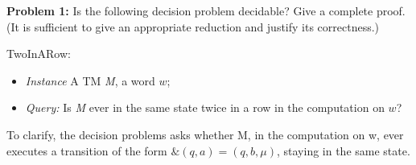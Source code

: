 
\noindent \textbf{Problem 1:} Is the following decision problem decidable? Give a complete proof. (It is sufficient to give an
appropriate reduction and justify its correctness.)

\vskip 0.1in

\noindent TwoInARow:

\begin{itemize}
    \item[] \textit{Instance} A TM \textit{M}, a word $w$;
    \item[] \textit{Query:} Is \textit{M} ever in the same state twice in a row in the computation on $w$?
\end{itemize}

\noindent To clarify, the decision problems asks whether M, in the computation on w, ever executes a transition of the form $\&(q, a) = (q, b, \mu)$, staying in the same state.
